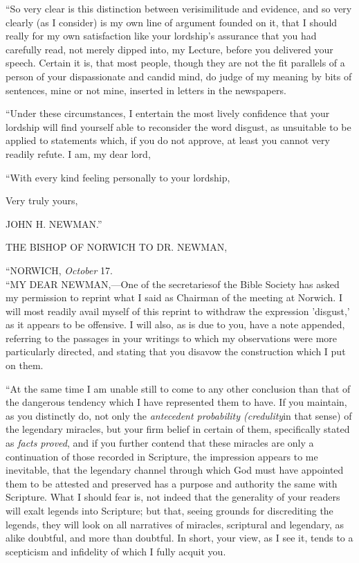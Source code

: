 ``So very clear is this distinction between
verisimilitude and evidence, and so very clearly (as I
consider) is my own line of argument founded on it, that
I should really for my own satisfaction like your
lordship's assurance that you had carefully read, not
merely dipped into, my Lecture, before you delivered your
speech. Certain it is, that most people, though they are
not the fit parallels of a person of your dispassionate
and candid mind, do judge of my meaning by bits of
sentences, mine or not mine, inserted in letters in the
newspapers.


``Under these circumstances, I entertain the most
lively confidence that your lordship will find yourself
able to reconsider the word disgust, as unsuitable to be
applied to statements which, if you do not approve, at
least you cannot very readily refute. I am, my dear lord,

``With every kind feeling personally to your
lordship,

Very truly yours,

JOHN H. NEWMAN.''





THE BISHOP OF NORWICH TO DR. NEWMAN,

``NORWICH, \emph{October} 17. \emph{}\\
``MY DEAR
NEWMAN,—One of the secretaries\textbf{}of
the Bible Society has asked my permission to reprint what
I said as Chairman of the meeting at Norwich. I will most
readily avail myself of this reprint to withdraw the
expression 'disgust,' as it appears to be offensive. I
will also, as is due to you, have a note appended,
referring to the passages in your writings to which my
observations were more particularly directed, and stating
that you disavow the construction which I put on them.


``At the same time I am unable still to come to
any other conclusion than that of the dangerous tendency
which I have represented them to have. If you maintain,
as you distinctly do, not only the \emph{antecedent
probability (credulity}in that sense) of the
legendary miracles, but your firm belief in certain of
them, specifically stated as \emph{facts} \emph{proved}, and
if you further contend that these miracles are only a
continuation of those recorded in Scripture, the
impression appears to me inevitable, that the legendary
channel through which God must have appointed them to be
attested and preserved has a purpose and authority the
same with Scripture. What I should fear is, not indeed
that the generality of your readers will exalt legends
into Scripture; but that, seeing grounds for discrediting
the legends, they will look on all narratives of
miracles, scriptural and legendary, as alike doubtful,
and more than doubtful. In short, your view, as I see it,
tends to a scepticism and infidelity of which I fully
acquit you.


